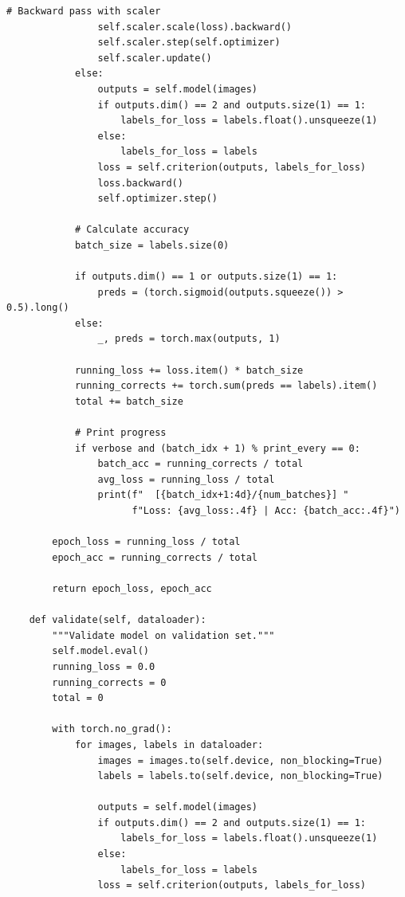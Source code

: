\documentclass[man,12pt,letterpaper,donotrepeattitle,floatsintext]{apa7}
\begin{document}
\begin{lstlisting}[style=pythonstyle]
                # Backward pass with scaler
                self.scaler.scale(loss).backward()
                self.scaler.step(self.optimizer)
                self.scaler.update()
            else:
                outputs = self.model(images)
                if outputs.dim() == 2 and outputs.size(1) == 1:
                    labels_for_loss = labels.float().unsqueeze(1)
                else:
                    labels_for_loss = labels
                loss = self.criterion(outputs, labels_for_loss)
                loss.backward()
                self.optimizer.step()
            
            # Calculate accuracy
            batch_size = labels.size(0)
            
            if outputs.dim() == 1 or outputs.size(1) == 1:
                preds = (torch.sigmoid(outputs.squeeze()) > 0.5).long()
            else:
                _, preds = torch.max(outputs, 1)
            
            running_loss += loss.item() * batch_size
            running_corrects += torch.sum(preds == labels).item()
            total += batch_size
            
            # Print progress
            if verbose and (batch_idx + 1) % print_every == 0:
                batch_acc = running_corrects / total
                avg_loss = running_loss / total
                print(f"  [{batch_idx+1:4d}/{num_batches}] "
                      f"Loss: {avg_loss:.4f} | Acc: {batch_acc:.4f}")
        
        epoch_loss = running_loss / total
        epoch_acc = running_corrects / total
        
        return epoch_loss, epoch_acc
    
    def validate(self, dataloader):
        """Validate model on validation set."""
        self.model.eval()
        running_loss = 0.0
        running_corrects = 0
        total = 0
        
        with torch.no_grad():
            for images, labels in dataloader:
                images = images.to(self.device, non_blocking=True)
                labels = labels.to(self.device, non_blocking=True)
                
                outputs = self.model(images)
                if outputs.dim() == 2 and outputs.size(1) == 1:
                    labels_for_loss = labels.float().unsqueeze(1)
                else:
                    labels_for_loss = labels
                loss = self.criterion(outputs, labels_for_loss)
                

\end{lstlisting}
\end{document}
